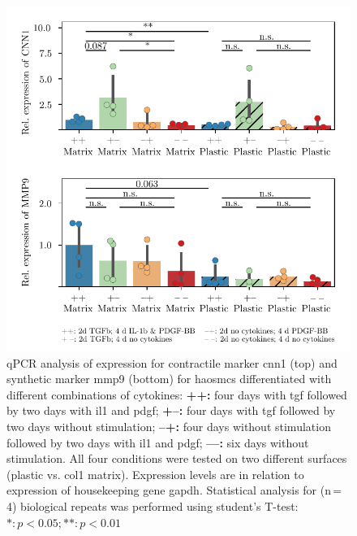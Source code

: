     \begin{figure}[h!]
    \capstart
        \centering
    	\includegraphics{Abbildung/qPCR.pdf}

    	\begin{minipage}{\captionwidth}
    		\caption[CNN_qPCR]{ \newline qPCR analysis of expression for contractile marker \ac{cnn1} (top) and synthetic marker \ac{mmp9} (bottom) for \acp{haosmc} differentiated with different combinations of cytokines:
            \textbf{++:} four days with \ac{tgf} followed by two days with \ac{il1} and \ac{pdgf};
            \textbf{+–:} four days with \ac{tgf} followed by two days without stimulation;
            \textbf{–+:} four days without stimulation followed by two days with \ac{il1} and \ac{pdgf};
            \textbf{––:} six days without stimulation.
            All four conditions were tested on two different surfaces (plastic vs. \ac{col1} matrix). Expression levels are in relation to expression of housekeeping gene \ac{gapdh}. Statistical analysis for (n\,=\,4) biological repeats was performed using student's T-test: $*: p < 0.05; **: p < 0.01$}
    		\label{fig:qPCR_result}
    	\end{minipage}
    \end{figure}

